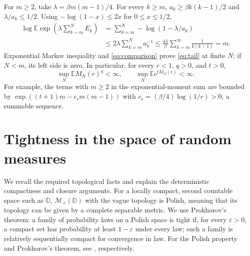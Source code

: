 \documentclass[11pt,a4paper]{article}
\numberwithin{equation}{section}
\theoremstyle{remark}
\newcommand{\D}{\mathbb D}
\newcommand{\E}{\mathbb E}
\newcommand{\Mplus}{\mathcal M_+}
\begin{document}
For $m\ge2$, take $\lambda=\beta m(m-1)/4$.
For every $k\ge m$,
$a_k\ge\beta k(k-1)/2$ and $\lambda/a_k\le1/2$.
Using $-\log(1-x)\le2x$ for $0\le x\le1/2$,
\begin{align*}
 \log\E\exp\left(\lambda\sum_{k=m}^N E_k\right)
 &=\sum_{k=m}^N-\log(1-\lambda/a_k)\\
 &\le2\lambda\sum_{k=m}^N a_k^{-1}
 \le\frac{4\lambda}{\beta}
       \sum_{k=m}^\infty\frac1{k(k-1)}=m.
\end{align*}
Exponential Markov inequality and \eqref{eq:comparison} prove
\eqref{eq:tail} at finite $N$; if $N<m$, its left side is zero.
In particular, for every $r<1$, $q>0$, and $t>0$,
\begin{equation}\label{eq:uniform-moments}
 \sup_N\E M_N(r)^q<\infty,
 \qquad\sup_N\E e^{tM_N(r)}<\infty.
\end{equation}
For example, the terms with $m\ge2$ in the exponential-moment sum
are bounded by
$\exp((t+1)m-c_rm(m-1))$ with
$c_r=(\beta/4)\log(1/r)>0$, a summable sequence.

\section{Tightness in the space of random measures}

We recall the required topological facts and explain the deterministic
compactness and closure arguments. For a locally compact, second
countable space such as $\D$, $\Mplus(\D)$ with the vague topology
is Polish, meaning that its topology can be given by a complete
separable metric. We use Prokhorov's theorem: a family of probability
laws on a Polish space is tight if, for every $\varepsilon>0$, a
compact set has probability at least $1-\varepsilon$ under every law;
such a family is relatively sequentially compact for convergence in
law. For the Polish property and Prokhorov's theorem, see
\cite[Theorems A2.6.III and A2.4.I]{DV1}, respectively.
\end{document}
